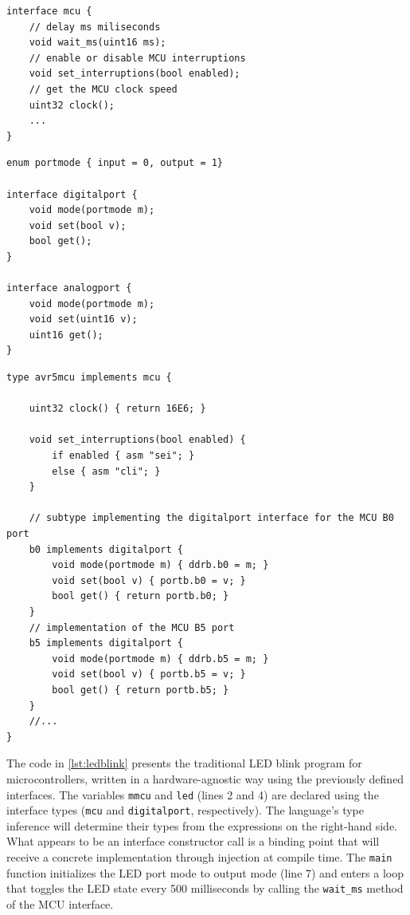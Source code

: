 \documentclass[sigconf]{acmart}
\begin{document}
\begin{lstlisting}[float=tp, language=rob, caption=An example MCU interface, label=lst:imcu]
interface mcu {
	// delay ms miliseconds
	void wait_ms(uint16 ms);
	// enable or disable MCU interruptions
	void set_interruptions(bool enabled);
	// get the MCU clock speed
	uint32 clock();
	...
}
\end{lstlisting}

\begin{lstlisting}[float=tp, caption=Interfaces for digital and analog ports, label=lst:iports]
enum portmode { input = 0, output = 1}

interface digitalport {
	void mode(portmode m);
	void set(bool v);
	bool get();
}

interface analogport {
	void mode(portmode m);
	void set(uint16 v);
	uint16 get();
}
\end{lstlisting}




\begin{lstlisting}[float=tp, caption=AVR MCU partial implementation, label=lst:avr5]
type avr5mcu implements mcu {

	uint32 clock() { return 16E6; }

	void set_interruptions(bool enabled) {
		if enabled { asm "sei"; }
		else { asm "cli"; }
	}

	// subtype implementing the digitalport interface for the MCU B0 port
	b0 implements digitalport {
		void mode(portmode m) { ddrb.b0 = m; }
		void set(bool v) { portb.b0 = v; }
		bool get() { return portb.b0; }
	}
	// implementation of the MCU B5 port
	b5 implements digitalport {
		void mode(portmode m) { ddrb.b5 = m; }
		void set(bool v) { portb.b5 = v; }
		bool get() { return portb.b5; }
	}
	//...
}
\end{lstlisting}



The code in \autoref{lst:ledblink} presents the traditional LED blink program for microcontrollers, written in a hardware-agnostic way using the previously defined interfaces. The variables {\tt mmcu} and {\tt led} (lines 2 and 4) are declared using the interface types ({\tt mcu} and {\tt digitalport}, respectively). The language's type inference will determine their types from the expressions on the right-hand side. What appears to be an interface constructor call is a binding point that will receive a concrete implementation through injection at compile time. The {\tt main} function initializes the LED port mode to output mode (line 7) and enters a loop that toggles the LED state every 500 milliseconds by calling the {\tt wait\_ms} method of the MCU interface.
\end{document}
